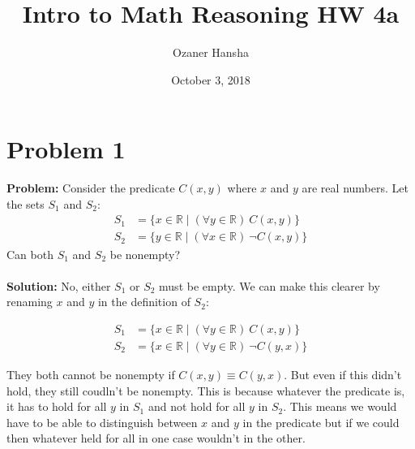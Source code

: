 \documentclass{article}
\begin{document}
\title{Intro to Math Reasoning HW 4a}
\author{Ozaner Hansha}
\date{October 3, 2018}
\maketitle

\section*{Problem 1}
\textbf{Problem:} Consider the predicate $C(x,y)$ where $x$ and $y$ are real numbers. Let the sets $S_1$ and $S_2$:
\begin{align*}
S_1&=\{x\in\mathbb R\mid(\forall y\in\mathbb R)\ C(x,y)\}\\
S_2&=\{y\in\mathbb R\mid(\forall x\in\mathbb R)\ \neg C(x,y)\}
\end{align*}
Can both $S_1$ and $S_2$ be nonempty?
\\\\
\textbf{Solution:} No, either $S_1$ or $S_2$ must be empty. We can make this clearer by renaming $x$ and $y$ in the definition of $S_2$:

\begin{align*}
S_1&=\{x\in\mathbb R\mid(\forall y\in\mathbb R)\ C(x,y)\}\\
S_2&=\{x\in\mathbb R\mid(\forall y\in\mathbb R)\ \neg C(y,x)\}
\end{align*}

They both cannot be nonempty if $C(x,y)\equiv C(y,x)$. But even if this didn't hold, they still coudln't be nonempty. This is because whatever the predicate is, it has to hold for all $y$ in $S_1$ and not hold for all $y$ in $S_2$. This means we would have to be able to distinguish between $x$ and $y$ in the predicate but if we could then whatever held for all in one case wouldn't in the other.

%
%

%
%
\end{document}
